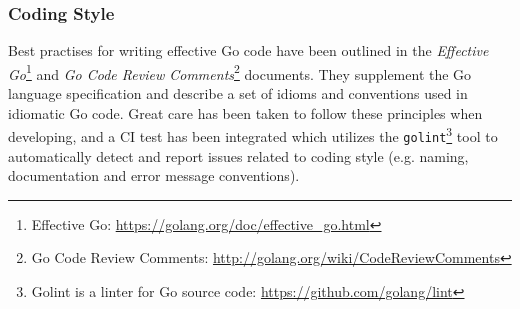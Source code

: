 
\subsubsection{Coding Style}

Best practises for writing effective Go code have been outlined in the \textit{Effective Go}\footnote{Effective Go: \url{https://golang.org/doc/effective_go.html}} and \textit{Go Code Review Comments}\footnote{Go Code Review Comments: \url{http://golang.org/wiki/CodeReviewComments}} documents. They supplement the Go language specification and describe a set of idioms and conventions used in idiomatic Go code. Great care has been taken to follow these principles when developing, and a CI test has been integrated which utilizes the \texttt{golint}\footnote{Golint is a linter for Go source code: \url{https://github.com/golang/lint}} tool to automatically detect and report issues related to coding style (e.g. naming, documentation and error message conventions).
